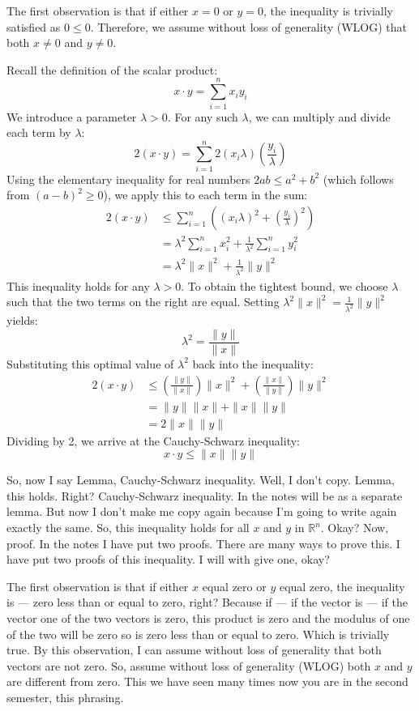 \begin{math-stroke}
The first observation is that if either $x = 0$ or $y = 0$, the inequality is trivially satisfied as $0 \le 0$. Therefore, we assume without loss of generality (WLOG) that both $x \neq 0$ and $y \neq 0$.

Recall the definition of the scalar product:
\[ x \cdot y = \sum_{i=1}^n x_i y_i \]
We introduce a parameter $\lambda > 0$. For any such $\lambda$, we can multiply and divide each term by $\lambda$:
\[ 2(x \cdot y) = \sum_{i=1}^n 2(x_i \lambda) \left( \frac{y_i}{\lambda} \right) \]
Using the elementary inequality for real numbers $2ab \le a^2 + b^2$ (which follows from $(a-b)^2 \ge 0$), we apply this to each term in the sum:
\begin{align*}
2(x \cdot y) &\le \sum_{i=1}^n \left( (x_i \lambda)^2 + \left( \frac{y_i}{\lambda} \right)^2 \right) \\
&= \lambda^2 \sum_{i=1}^n x_i^2 + \frac{1}{\lambda^2} \sum_{i=1}^n y_i^2 \\
&= \lambda^2 \|x\|^2 + \frac{1}{\lambda^2} \|y\|^2
\end{align*}
This inequality holds for any $\lambda > 0$. To obtain the tightest bound, we choose $\lambda$ such that the two terms on the right are equal. Setting $\lambda^2 \|x\|^2 = \frac{1}{\lambda^2} \|y\|^2$ yields:
\[ \lambda^2 = \frac{\|y\|}{\|x\|} \]
Substituting this optimal value of $\lambda^2$ back into the inequality:
\begin{align*}
2(x \cdot y) &\le \left( \frac{\|y\|}{\|x\|} \right) \|x\|^2 + \left( \frac{\|x\|}{\|y\|} \right) \|y\|^2 \\
&= \|y\|\|x\| + \|x\|\|y\| \\
&= 2\|x\|\|y\|
\end{align*}
Dividing by 2, we arrive at the Cauchy-Schwarz inequality:
\[ x \cdot y \le \|x\|\|y\| \]
\end{math-stroke}

\begin{spoken-clean}[00:05:50 - 00:08:20]
So, now I say Lemma, Cauchy-Schwarz inequality. Well, I don't copy. Lemma, this holds. Right? Cauchy-Schwarz inequality. In the notes will be as a separate lemma. But now I don't make me copy again because I'm going to write again exactly the same. So, this inequality holds for all $x$ and $y$ in $\mathbb{R}^n$. Okay? Now, proof. In the notes I have put two proofs. There are many ways to prove this. I have put two proofs of this inequality. I will with give one, okay?

The first observation is that if either $x$ equal zero or $y$ equal zero, the inequality is --- zero less than or equal to zero, right? Because if --- if the vector is --- if the vector one of the two vectors is zero, this product is zero and the modulus of one of the two will be zero so is zero less than or equal to zero. Which is trivially true. By this observation, I can assume without loss of generality that both vectors are not zero. So, assume without loss of generality (WLOG) both $x$ and $y$ are different from zero. This we have seen many times now you are in the second semester, this  phrasing.
\end{spoken-clean}

